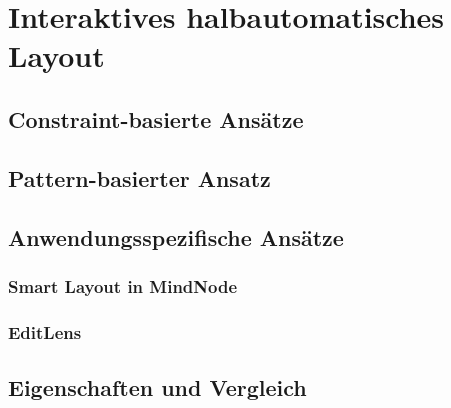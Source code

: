 
\section{Interaktives halbautomatisches Layout}
\label{sec:interactive-user-controlled-layout}


\subsection{Constraint-basierte Ansätze}


\subsection{Pattern-basierter Ansatz}


\subsection{Anwendungsspezifische Ansätze}

\subsubsection{Smart Layout in MindNode}


\subsubsection{EditLens}


\subsection{Eigenschaften und Vergleich}













